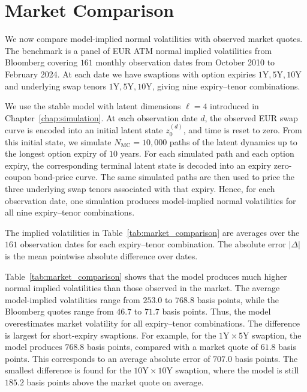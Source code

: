 \section{Market Comparison}
\label{sec:market_comparison}

We now compare model-implied normal volatilities with observed market quotes. The benchmark is a panel of EUR ATM normal implied volatilities from Bloomberg covering \(161\) monthly observation dates from October 2010 to February 2024. At each date we have swaptions with option expiries \({1\mathrm{Y},5\mathrm{Y},10\mathrm{Y}}\) and underlying swap tenors \({1\mathrm{Y},5\mathrm{Y},10\mathrm{Y}}\), giving nine expiry--tenor combinations.

We use the stable model with latent dimensions \(\ell = 4\) introduced in Chapter~\ref{chap:simulation}. At each observation date \(d\), the observed EUR swap curve is encoded into an initial latent state \(z_0^{(d)}\), and time is reset to zero. From this initial state, we simulate \(N_{\mathrm{MC}}=10{,}000\) paths of the latent dynamics up to the longest option expiry of \(10\) years. For each simulated path and each option expiry, the corresponding terminal latent state is decoded into an expiry zero-coupon bond-price curve. The same simulated paths are then used to price the three underlying swap tenors associated with that expiry. Hence, for each observation date, one simulation produces model-implied normal volatilities for all nine expiry--tenor combinations.

The implied volatilities in Table~\ref{tab:market_comparison} are averages over the \(161\) observation dates for each expiry--tenor combination. The absolute error \(\lvert\Delta\rvert\) is the mean pointwise absolute difference over dates.



Table~\ref{tab:market_comparison} shows that the model produces much higher normal implied volatilities than those observed in the market. The average model-implied volatilities range from \(253.0\) to \(768.8\) basis points, while the Bloomberg quotes range from \(46.7\) to \(71.7\) basis points. Thus, the model overestimates market volatility for all expiry--tenor combinations. The difference is largest for short-expiry swaptions. For example, for the \(1\mathrm{Y}\times5\mathrm{Y}\) swaption, the model produces \(768.8\) basis points, compared with a market quote of \(61.8\) basis points. This corresponds to an average absolute error of \(707.0\) basis points. The smallest difference is found for the \(10\mathrm{Y}\times10\mathrm{Y}\) swaption, where the model is still \(185.2\) basis points above the market quote on average.

